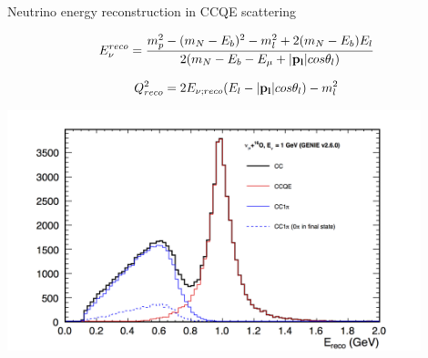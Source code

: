 \begin{frame}{Neutrino energy reconstruction in CCQE scattering}

\begin{equation*}
   E_{\nu}^{reco} = \frac{m_p^2 - (m_N-E_b)^2 - m_l^2 + 2(m_N-E_b)E_l}
                         {2(m_N-E_b-E_{\mu}+|{\bf p_l}|cos\theta_l)}
\end{equation*}

\begin{equation*}
   Q^2_{reco} = 2  E_{\nu;reco} (E_l - |{\bf p_l}|cos\theta_l) - m_l^2
\end{equation*}

 \includegraphics[width=0.90\textwidth]{./images/nuint/ccqe/ereco_numuO16_1GeV.png}\\

\end{frame}


%
%
%

